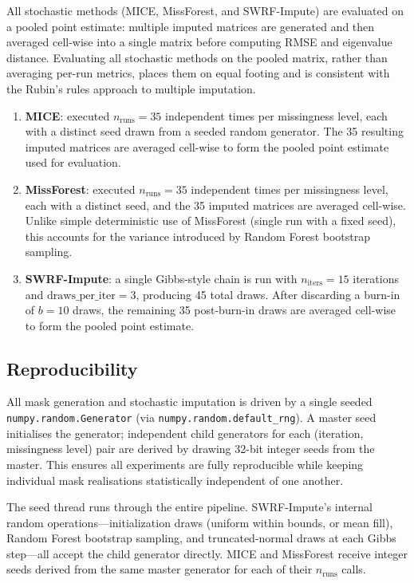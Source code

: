 \documentclass[preprint]{aastex631}
\begin{document}
All stochastic methods (MICE, MissForest, and SWRF-Impute) are evaluated on a pooled point estimate: multiple imputed matrices are generated and then averaged cell-wise into a single matrix before computing RMSE and eigenvalue distance. Evaluating all stochastic methods on the pooled matrix, rather than averaging per-run metrics, places them on equal footing and is consistent with the Rubin's rules approach to multiple imputation.

\begin{enumerate}
  \item \textbf{MICE}: executed $n_{\text{runs}} = 35$ independent times per missingness level, each with a distinct seed drawn from a seeded random generator. The 35 resulting imputed matrices are averaged cell-wise to form the pooled point estimate used for evaluation.
  \item \textbf{MissForest}: executed $n_{\text{runs}} = 35$ independent times per missingness level, each with a distinct seed, and the 35 imputed matrices are averaged cell-wise. Unlike simple deterministic use of MissForest (single run with a fixed seed), this accounts for the variance introduced by Random Forest bootstrap sampling.
  \item \textbf{SWRF-Impute}: a single Gibbs-style chain is run with $n_{\text{iters}} = 15$ iterations and $\text{draws\_per\_iter} = 3$, producing 45 total draws. After discarding a burn-in of $b = 10$ draws, the remaining 35 post-burn-in draws are averaged cell-wise to form the pooled point estimate.
\end{enumerate}

\subsection{Reproducibility}

All mask generation and stochastic imputation is driven by a single seeded \texttt{numpy.random.Generator} (via \texttt{numpy.random.default\_rng}). A master seed initialises the generator; independent child generators for each (iteration, missingness level) pair are derived by drawing 32-bit integer seeds from the master. This ensures all experiments are fully reproducible while keeping individual mask realisations statistically independent of one another.

The seed thread runs through the entire pipeline. SWRF-Impute's internal random operations---initialization draws (uniform within bounds, or mean fill), Random Forest bootstrap sampling, and truncated-normal draws at each Gibbs step---all accept the child generator directly. MICE and MissForest receive integer seeds derived from the same master generator for each of their $n_{\text{runs}}$ calls.
\end{document}
